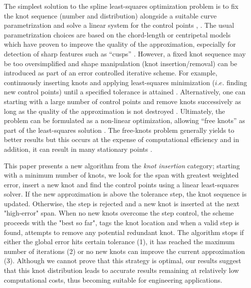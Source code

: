 \documentclass[a4paper,12pt]{article}
\begin{document}
  The simplest solution to the spline least-squares optimization problem is to fix the 
  knot sequence (number and distribution) alongside a suitable curve parametrization and solve a linear system for the 
  control points \cite[Ch. 9.4]{nurbs_book}, \cite{deboor1968}. 
  The usual parametrization choices are based on the chord-length or centripetal models  which 
  have proven to improve the quality of the approximation, 
  especially for detection of sharp features such as ``cusps'' \cite{hoschek1988,speer1998,lee1989, ma1995}. 
  However,  a fixed knot sequence may be too oversimplified and 
  shape manipulation (knot insertion/removal) \cite{piegl1989, boehm1980, goldman1992} 
   can be introduced as part of an error controlled iterative scheme. For example, 
    continuously inserting knots and applying least-squares minimization 
   ($i.e.$ finding new control points) until a specified tolerance is attained
    \cite{piegl2000, park2007}. Alternatively, one can starting with a large number 
    of control points and remove knots successively as long as the 
     quality of the approximation is not destroyed \cite{lyche1987, tiller1992}. 
   Ultimately, the problem can be formulated as a non-linear optimization, allowing 
   ``free knots'' as part of the least-squares solution \cite{schwetlick1995least, beliakov2004}. 
   The free-knots problem generally yields to better results but this occurs at the expense 
   of computational efficiency \cite{randrzanarivony2002} and in addition, it can result 
   in many stationary points \cite{jupp1978}.
   
   This paper presents a new algorithm from the \emph{knot insertion} category; 
   starting with a minimum number of knots, we look for the span with greatest weighted error, 
   insert a new knot and find the control points using a linear least-squares solver. 
   If the new approximation is above the tolerance step, the knot sequence is updated. 
   Otherwise, the step is rejected and a new knot is inserted at the next  "high-error" span. 
   When no new knots overcome the step control, the scheme proceeds with the "best so far", 
   tags the knot location and when a valid step is found, 
   attempts to remove any potential redundant knot. 
    The algorithm stops if either the global error hits certain tolerance (1), it has 
    reached the maximum number of iterations (2) or no new knots can 
    improve the current approximation (3). 
  Although we cannot prove that this strategy is optimal,
  our results suggest that this knot distribution leads to accurate results
  remaining at relatively low computational costs, thus becoming suitable  for engineering applications. 
  
\end{document}
